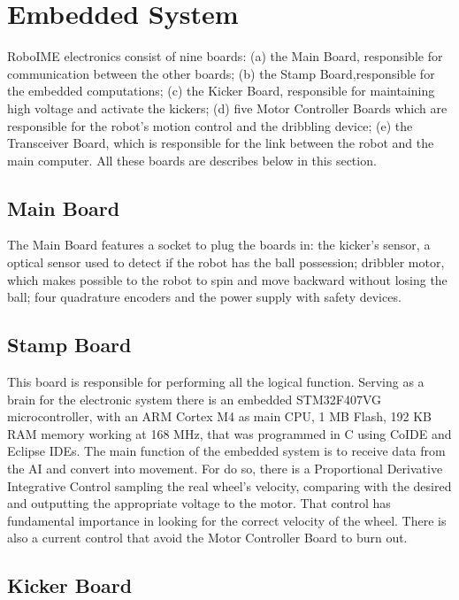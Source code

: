 \section{Embedded System}\label{emb_sys_sec}

RoboIME electronics consist of nine boards: (a) the Main Board, responsible for
communication between the other boards; (b) the Stamp Board,responsible for the
embedded computations; (c) the Kicker Board, responsible for maintaining high
voltage and activate the kickers; (d) five Motor Controller Boards which are
responsible for the robot's motion control and the dribbling device; (e) the
Transceiver Board, which is responsible for the link between the robot and the
main computer. All these boards are describes below in this section.


\subsection{Main Board}

The Main Board features a socket to plug the boards in: the kicker's sensor, a
optical sensor used to detect if the robot has the ball possession; dribbler
motor, which makes possible to the robot to spin and move backward without
losing the ball; four quadrature encoders and the power supply with safety
devices.


\subsection{Stamp Board}

This board is responsible for performing all the logical function. Serving as a
brain for the electronic system there is an embedded STM32F407VG
microcontroller, with an ARM Cortex M4 as main CPU, 1 MB Flash, 192 KB RAM
memory working at 168 MHz, that was programmed in C using CoIDE and Eclipse
IDEs. The main function of the embedded system is to receive data from the AI
and convert into movement. For do so, there is a Proportional Derivative
Integrative Control sampling the real wheel's velocity, comparing with the
desired and outputting the appropriate voltage to the motor.
That control has fundamental importance in looking for the correct velocity of
the wheel. There is also a current control that avoid the Motor Controller
Board to burn out.



\subsection{Kicker Board}

